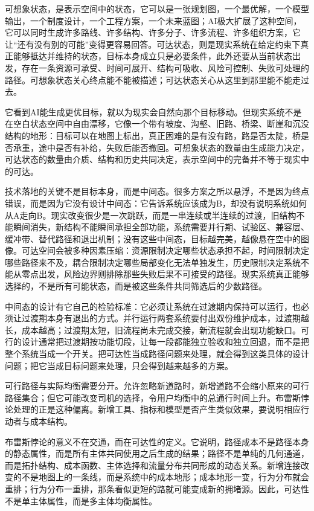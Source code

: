 
可想象状态，是表示空间中的状态，它可以是一张规划图，一个最优解，一个模型输出，一个制度设计，一个工程方案，一个未来蓝图；AI极大扩展了这种空间，它可以同时生成许多路线、许多结构、许多分子、许多流程、许多组织方案，它让“还有没有别的可能”变得更容易回答。可达状态，则是现实系统在给定约束下真正能够抵达并维持的状态，目标本身成立只是必要条件，此外还要从当前状态出发，存在一条资源可承受、时间可展开、结构可吸收、风险可控制、失败可处理的路径。可想象状态关心终点能不能被描述；可达状态关心从这里到那里能不能走过去。

它看到AI能生成更优目标，就以为现实会自然向那个目标移动。但现实系统不是在空白状态空间中自由漂移，它像一个带有坡度、沟壑、旧路、桥梁、断崖和沉没结构的地形：目标可以在地图上标出，真正困难的是有没有路，路是否太陡，桥是否承重，途中是否有补给，失败后能否撤回。可想象状态的数量由生成能力决定，可达状态的数量由介质、结构和历史共同决定，表示空间中的完备并不等于现实中的可达。

技术落地的关键不是目标本身，而是中间态。很多方案之所以悬浮，不是因为终点错误，而是因为它没有设计中间态：它告诉系统应该成为B，却没有说明系统如何从A走向B。现实改变很少是一次跳跃，而是一串连续或半连续的过渡，旧结构不能瞬间消失，新结构不能瞬间承担全部功能，系统需要并行期、试验区、兼容层、缓冲带、替代路径和退出机制；没有这些中间态，目标越完美，越像悬在空中的图像。可达空间会被多种因素压缩：资源限制决定哪些状态承担不起，时间限制决定哪些路径来不及，耦合限制决定哪些局部变化无法单独发生，历史限制决定系统不能从零点出发，风险边界则排除那些失败后果不可接受的路径。现实系统真正能够选择的，不是所有可能状态，而是被这些条件共同筛选后的少数路径。

中间态的设计有它自己的检验标准：它必须让系统在过渡期内保持可以运行，也必须让过渡期本身有退出的方式。并行运行两套系统要付出双份维护成本，过渡期越长，成本越高；过渡期太短，旧流程尚未完成交接，新流程就会出现功能缺口。可行的设计通常把过渡期按功能切段，让每一段都能独立验收和独立回退，而不是把整个系统当成一个开关。把可达性当成路径问题来处理，就会得到这类具体的设计问题；把它当成目标问题来处理，只会得到越来越多的方案。


可行路径与实际均衡需要分开。允许忽略新道路时，新增道路不会缩小原来的可行路径集合；但它可能改变司机的选择，令用户均衡中的总通行时间上升。布雷斯悖论处理的正是这种偏离。新增工具、指标和模型是否产生类似效果，要说明相应行动者与成本结构。

布雷斯悖论的意义不在交通，而在可达性的定义。它说明，路径成本不是路径本身的静态属性，而是所有主体共同使用之后生成的结果；路径不是单纯的几何通道，而是拓扑结构、成本函数、主体选择和流量分布共同形成的动态关系。新增连接改变的不是地图上的一条线，而是系统中的成本地形；成本地形一变，行为分布就会重排；行为分布一重排，那条看似更短的路就可能变成新的拥堵源。因此，可达性不是单主体属性，而是多主体均衡属性。

